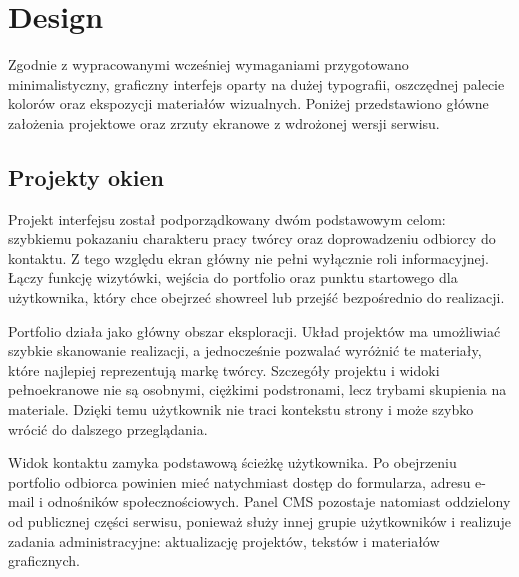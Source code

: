 \section{Design}
Zgodnie z wypracowanymi wcześniej wymaganiami przygotowano minimalistyczny, graficzny interfejs oparty na dużej typografii, oszczędnej palecie kolorów oraz ekspozycji materiałów wizualnych. Poniżej przedstawiono główne założenia projektowe oraz zrzuty ekranowe z wdrożonej wersji serwisu.

\subsection{Projekty okien}
Projekt interfejsu został podporządkowany dwóm podstawowym celom: szybkiemu pokazaniu charakteru pracy twórcy oraz doprowadzeniu odbiorcy do kontaktu. Z tego względu ekran główny nie pełni wyłącznie roli informacyjnej. Łączy funkcję wizytówki, wejścia do portfolio oraz punktu startowego dla użytkownika, który chce obejrzeć showreel lub przejść bezpośrednio do realizacji.

Portfolio działa jako główny obszar eksploracji. Układ projektów ma umożliwiać szybkie skanowanie realizacji, a jednocześnie pozwalać wyróżnić te materiały, które najlepiej reprezentują markę twórcy. Szczegóły projektu i widoki pełnoekranowe nie są osobnymi, ciężkimi podstronami, lecz trybami skupienia na materiale. Dzięki temu użytkownik nie traci kontekstu strony i może szybko wrócić do dalszego przeglądania.

Widok kontaktu zamyka podstawową ścieżkę użytkownika. Po obejrzeniu portfolio odbiorca powinien mieć natychmiast dostęp do formularza, adresu e-mail i odnośników społecznościowych. Panel CMS pozostaje natomiast oddzielony od publicznej części serwisu, ponieważ służy innej grupie użytkowników i realizuje zadania administracyjne: aktualizację projektów, tekstów i materiałów graficznych.


